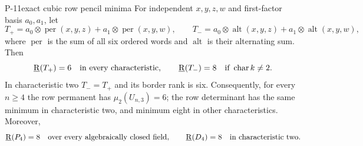 \begin{finding}{P-11}{exact cubic row pencil minima}
For independent $x,y,z,w$ and first-factor basis $a_0,a_1$,
let
\[
 T_+=a_0\otimes\operatorname{per}(x,y,z)
       +a_1\otimes\operatorname{per}(x,y,w),\qquad
 T_-=a_0\otimes\operatorname{alt}(x,y,z)
       +a_1\otimes\operatorname{alt}(x,y,w),
\]
where $\operatorname{per}$ is the sum of all six ordered
words and $\operatorname{alt}$ is their alternating sum.
Then
\[
 \underline{\mathrm R}(T_+)=6\quad\hbox{in every characteristic},
 \qquad
 \underline{\mathrm R}(T_-)=8\quad\hbox{if }\operatorname{char}k\ne2.
\]
In characteristic two $T_-=T_+$ and its border rank is six.
Consequently, for every $n\geq4$ the row permanent has
$\mu_2(U_{n,3})=6$; the row determinant has the same
minimum in characteristic two, and minimum eight
in other characteristics. Moreover,
\[
 \underline{\mathrm R}(P_4)=8\quad\hbox{over every algebraically closed field},
 \qquad \underline{\mathrm R}(D_4)=8\quad\hbox{in characteristic two}.
\]
\end{finding}
